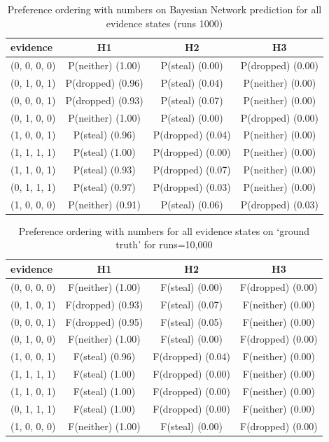 \documentclass[12pt]{article}
\begin{document}
\begin{table}[htbp]
\begin{center}
\begin{tabular}{|l|c|c|c|}
\hline
evidence & H1 & H2 & H3 \\
\hline
(0, 0, 0, 0)&P(neither) (1.00) & P(steal) (0.00) & P(dropped) (0.00) \\
(0, 1, 0, 1)&P(dropped) (0.96) & P(steal) (0.04) & P(neither) (0.00) \\
(0, 0, 0, 1)&P(dropped) (0.93) & P(steal) (0.07) & P(neither) (0.00) \\
(0, 1, 0, 0)&P(neither) (1.00) & P(steal) (0.00) & P(dropped) (0.00) \\
(1, 0, 0, 1)&P(steal) (0.96) & P(dropped) (0.04) & P(neither) (0.00) \\
(1, 1, 1, 1)&P(steal) (1.00) & P(dropped) (0.00) & P(neither) (0.00) \\
(1, 1, 0, 1)&P(steal) (0.93) & P(dropped) (0.07) & P(neither) (0.00) \\
(0, 1, 1, 1)&P(steal) (0.97) & P(dropped) (0.03) & P(neither) (0.00) \\
(1, 0, 0, 0)&P(neither) (0.91) & P(steal) (0.06) & P(dropped) (0.03) \\
\hline
\end{tabular}
\end{center}
\caption{ Preference ordering with numbers on Bayesian Network prediction for all evidence states (runs 1000)}
\label{somebody}
\end{table}
\begin{table}[htbp]
\begin{center}
\begin{tabular}{|l|c|c|c|}
\hline
evidence & H1 & H2 & H3 \\
\hline
(0, 0, 0, 0)&F(neither) (1.00) & F(steal) (0.00) & F(dropped) (0.00) \\
(0, 1, 0, 1)&F(dropped) (0.93) & F(steal) (0.07) & F(neither) (0.00) \\
(0, 0, 0, 1)&F(dropped) (0.95) & F(steal) (0.05) & F(neither) (0.00) \\
(0, 1, 0, 0)&F(neither) (1.00) & F(steal) (0.00) & F(dropped) (0.00) \\
(1, 0, 0, 1)&F(steal) (0.96) & F(dropped) (0.04) & F(neither) (0.00) \\
(1, 1, 1, 1)&F(steal) (1.00) & F(dropped) (0.00) & F(neither) (0.00) \\
(1, 1, 0, 1)&F(steal) (1.00) & F(dropped) (0.00) & F(neither) (0.00) \\
(0, 1, 1, 1)&F(steal) (1.00) & F(dropped) (0.00) & F(neither) (0.00) \\
(1, 0, 0, 0)&F(neither) (1.00) & F(steal) (0.00) & F(dropped) (0.00) \\
\hline
\end{tabular}
\end{center}
\caption{ Preference ordering with numbers for all evidence states on `ground truth' for runs=10,000}
\label{heretic}
\end{table}
\end{document}
